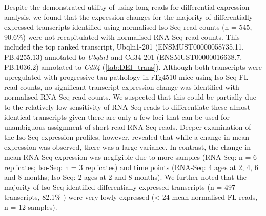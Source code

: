 Despite the demonstrated utility of using long reads for differential expression analysis, we found that the expression changes for the majority of differentially expressed transcripts identified using normalised Iso-Seq read counts (n = 545, 90.6\%) were not recapitulated with normalised RNA-Seq read counts. This included the top ranked transcript, Ubqln1-201 (ENSMUST00000058735.11, PB.4255.13) annotated to \textit{Ubqln1} and Cd34-201 (ENSMUST00000016638.7, PB.1036.2) annotated to \textit{Cd34} (\cref{tab:DEI_trans}). Although both transcripts were upregulated with progressive tau pathology in rTg4510 mice using Iso-Seq FL read counts, no significant transcript expression change was identified with normalised RNA-Seq read counts. We suspected that this could be partially due to the relatively low sensitivity of RNA-Seq reads to differentiate these almost-identical transcripts given there are only a few loci that can be used for unambiguous assignment of short-read RNA-Seq reads. Deeper examination of the Iso-Seq expression profiles, however, revealed that while a change in mean expression was observed, there was a large variance. In contrast, the change in mean RNA-Seq expression was negligible due to more samples (RNA-Seq: n = 6 replicates; Iso-Seq: n = 3 replicates) and time points (RNA-Seq: 4 ages at 2, 4, 6 and 8 months; Iso-Seq: 2 ages at 2 and 8 months). We further noted that the majority of Iso-Seq-identified differentially expressed transcripts (n = 497 transcripts, 82.1\% ) were very-lowly expressed (< 24 mean normalised FL reads, n = 12 samples). 

